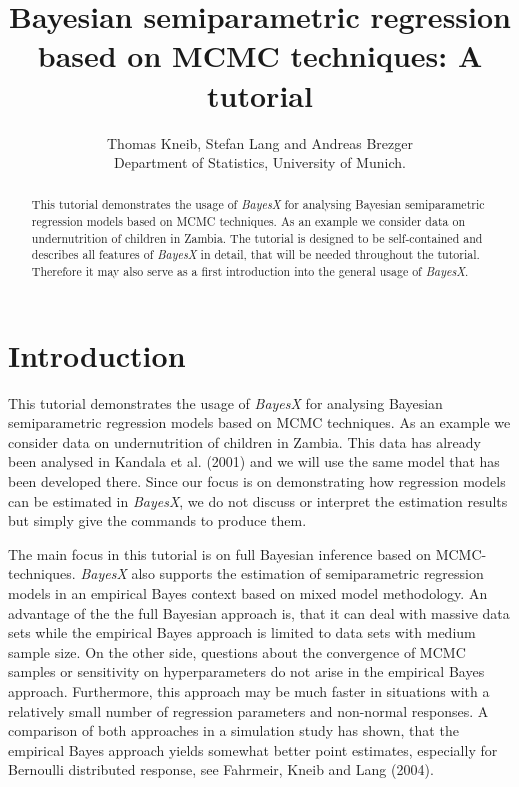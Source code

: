 \documentclass{article}
\begin{document}
\title{Bayesian semiparametric regression based on MCMC techniques: A tutorial}
\author{Thomas Kneib, Stefan Lang and Andreas Brezger\\ [.25cm]
\normalsize Department of Statistics, University of Munich. }
\maketitle

\begin{abstract}
This tutorial demonstrates the usage of {\it BayesX} for analysing
Bayesian semiparametric regression models based on MCMC
techniques. As an example we consider data on undernutrition of
children in Zambia. The tutorial is designed to be self-contained
and describes all features of {\it BayesX} in detail, that will be
needed throughout the tutorial. Therefore it may also serve as a
first introduction into the general usage of {\em BayesX}.
\end{abstract}

\tableofcontents

\newpage
\section{Introduction}\label{data}

This tutorial demonstrates the usage of {\it BayesX} for analysing
Bayesian semiparametric regression models based on MCMC
techniques. As an example we consider data on undernutrition of
children in Zambia. This data has already been analysed in Kandala
et al. (2001) \nocite{kanlan01} and we will use the same model
that has been developed there. Since our focus is on demonstrating
how regression models can be estimated in {\em BayesX}, we do not
discuss or interpret the estimation results but simply give the
commands to produce them.

The main focus in this tutorial is on full Bayesian inference based
on MCMC-techniques. {\it BayesX} also supports the estimation of
semiparametric regression models in an empirical Bayes context based
on mixed model methodology. An advantage of the the full Bayesian
approach is, that it can deal with massive data sets while the
empirical Bayes approach is limited to data sets with medium sample
size. On the other side, questions about the convergence of MCMC
samples or sensitivity on hyperparameters do not arise in the
empirical Bayes approach. Furthermore, this approach may be much
faster in situations with a relatively small number of regression
parameters and non-normal responses. A comparison of both approaches
in a simulation study has shown, that the empirical Bayes approach
yields somewhat better point estimates, especially for Bernoulli
distributed response, see Fahrmeir, Kneib and Lang
(2004).\nocite{fahkne04}
\end{document}
